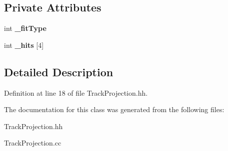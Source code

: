 \subsection*{Private Attributes}
\begin{DoxyCompactItemize}
\item 
int {\bfseries \_\-fitType}\label{classTBTrack_1_1TrackProjection_ac62ce7e8caa0726293c426b63be9afb0}

\item 
int {\bfseries \_\-hits} [4]\label{classTBTrack_1_1TrackProjection_a68bc579b0e61af75267ac3cc3fa72663}

\end{DoxyCompactItemize}


\subsection{Detailed Description}


Definition at line 18 of file TrackProjection.hh.

The documentation for this class was generated from the following files:\begin{DoxyCompactItemize}
\item 
TrackProjection.hh\item 
TrackProjection.cc\end{DoxyCompactItemize}
